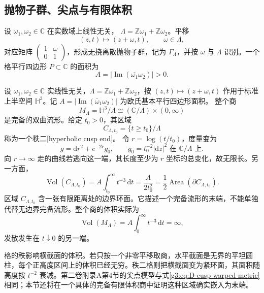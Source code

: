 \subsection{抛物子群、尖点与有限体积}
\label{g3:subsec:D04:04}

设 \(\omega_1,\omega_2\in\mathbb C\) 在实数域上线性无关，
\(\Lambda=\mathbb Z\omega_1+\mathbb Z\omega_2\)。平移
\[
	(z,t)\longmapsto(z+\omega,t),\qquad\omega\in\Lambda,
\]
对应矩阵 \(\begin{pmatrix}1&\omega\\0&1\end{pmatrix}\)，形成无挠离散抛物子群，记为 \(\Gamma_\Lambda\)，并按 \(\omega\) 与 \(\Lambda\) 识别。一个格平行四边形 \(P\subset\mathbb C\) 的面积为
\[
	A=\bigl|\operatorname{Im}(\overline{\omega_1}\omega_2)\bigr|>0.
\]

\begin{example}\label{g3:exm:D-rank-two-cusp}
	设 \(\omega_1,\omega_2\in\mathbb C\) 实线性无关，\(\Lambda=\mathbb Z\omega_1+\mathbb Z\omega_2\)，按 \((z,t)\mapsto(z+\omega,t)\) 作用于标准上半空间 \(\mathbb H^3\)。记 \(A=|\operatorname{Im}(\bar\omega_1\omega_2)|\) 为欧氏基本平行四边形面积。
	整个商
	\[
		M_\Lambda=\mathbb H^3/\Lambda
		    \cong(\mathbb C/\Lambda)\times(0,\infty)
	\]
	是完备的双曲流形。给定 \(t_0>0\)，其区域
	\[
		C_{\Lambda,t_0}
		   =\{t\ge t_0\}/\Lambda
	\]
	称为一个秩二[hyperbolic cusp end]。
	令 \(r=\log(t/t_0)\)，度量变为
	\begin{equation}\label{g3:eq:D-cusp-warped-metric}
		g=\mathrm dr^2+e^{-2r}g_0,\qquad
		g_0=t_0^{-2}|\mathrm dz|^2\text{ 在 }\mathbb C/\Lambda\text{ 上}.
	\end{equation}
	向 \(r\to\infty\) 走的曲线若逃向这一端，其长度至少为 \(r\) 坐标的总变化，故无限长。另一方面，
	\begin{equation}\label{g3:eq:D-rank-two-cusp-volume}
		\operatorname{Vol}(C_{\Lambda,t_0})
		=A\int_{t_0}^{\infty}t^{-3}\,\mathrm dt
		=\frac{A}{2t_0^2}
		=\frac12\operatorname{Area}(\partial C_{\Lambda,t_0}).
	\end{equation}
	区域 \(C_{\Lambda,t_0}\) 含一张有限距离处的边界环面。它描述一个完备流形的末端，不能单独代替无边界完备流形。整个商的体积实际为
	\[
		\operatorname{Vol}(M_\Lambda)
		=A\int_0^\infty t^{-3}\,\mathrm dt=\infty,
	\]
	发散发生在 \(t\downarrow0\) 的另一端。
\end{example}

格的秩影响横截面的体积。若只按一个非零平移取商，水平截面是无界的平坦圆柱，每个正高度区间上的体积已经无穷。秩二格则把横截面变为紧环面，其面积随高度按 \(t^{-2}\) 衰减。第二卷附录A第4节的尖点模型与式\eqref{g3:eq:D-cusp-warped-metric}相同；本节还将在一个具体的完备有限体积商中证明这种区域确实嵌入为末端。

